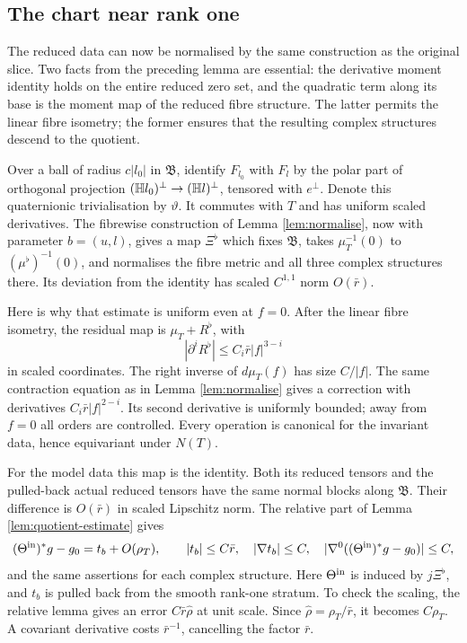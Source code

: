 \subsection{The chart near rank one}
The reduced data can now be normalised by the same construction
as the original slice. Two facts from the preceding lemma are
essential: the derivative moment identity holds on the entire
reduced zero set, and the quadratic term along its base is the
moment map of the reduced fibre structure. The latter permits the
linear fibre isometry; the former ensures that the resulting
complex structures descend to the quotient.

Over a ball of radius $c|l_0|$ in $\mathfrak B$, identify
$F_{l_0}$ with $F_l$ by the polar part of orthogonal projection
$(\mathbb H l_0)^\perp\to(\mathbb H l)^\perp$, tensored with $e^\perp$.
Denote this quaternionic trivialisation by $\vartheta$.
It commutes with $T$ and has uniform scaled derivatives.
The fibrewise construction of Lemma \ref{lem:normalise}, now
with parameter $b=(u,l)$, gives a map $\Xi^\flat$ which
fixes $\mathfrak B$, takes $\mu_T^{-1}(0)$ to
$(\mu^\flat)^{-1}(0)$, and normalises the fibre metric and
all three complex structures there. Its deviation from the
identity has scaled $C^{1,1}$ norm $O(\bar r)$.

Here is why that estimate is uniform even at $f=0$. After the
linear fibre isometry, the residual map is
$\mu_T+R^\flat$, with
\[
 |\partial^iR^\flat|\le C_i\bar r|f|^{3-i}
\]
in scaled coordinates. The right inverse of $d\mu_T(f)$ has
size $C/|f|$. The same contraction equation as in Lemma
\ref{lem:normalise} gives a correction with derivatives
$C_i\bar r|f|^{2-i}$. Its second derivative is uniformly
bounded; away from $f=0$ all orders are controlled. Every
operation is canonical for the invariant data, hence equivariant
under $N(T)$.

For the model data this map is the identity. Both its reduced
tensors and the pulled-back actual reduced tensors have the same
normal blocks along $\mathfrak B$. Their difference is
$O(\bar r)$ in scaled Lipschitz norm. The relative part of
Lemma \ref{lem:quotient-estimate} gives
\begin{equation}\label{eq:inner-estimate}
 (\Theta^{\rm in})^*g-g_0=t_b+O(\rho_T),\qquad
 |t_b|\le C\bar r,\quad|\nabla t_b|\le C,
 \quad|\nabla^0((\Theta^{\rm in})^*g-g_0)|\le C,
\end{equation}
and the same assertions for each complex structure. Here
$\Theta^{\rm in}$ is induced by $j\Xi^\flat$, and $t_b$ is
pulled back from the smooth rank-one stratum. To check the
scaling, the relative lemma gives an error
$C\bar r\widehat\rho$ at unit scale. Since
$\widehat\rho=\rho_T/\bar r$, it becomes $C\rho_T$.
A covariant derivative costs $\bar r^{-1}$, cancelling
the factor $\bar r$.

